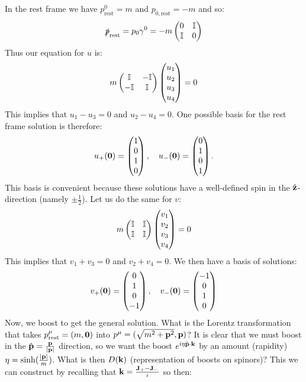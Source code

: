 In the rest frame we have $p^0_{\text{rest}} = m$ and $p_{0, \text{rest}} = -m$ and so:
\begin{equation}
    \slashed{p}_{\text{rest}} = p_0\gamma^0 = -m\begin{pmatrix}0 & \mathbb{I} \\ \mathbb{I} & 0\end{pmatrix}
\end{equation}
Thus our equation for $u$ is:
\begin{equation}
    m\begin{pmatrix}\mathbb{I} & -\mathbb{I} \\ -\mathbb{I} & \mathbb{I}\end{pmatrix}\begin{pmatrix}u_1 \\ u_2 \\ u_3 \\ u_4\end{pmatrix} = 0
\end{equation}
This implies that $u_1 -u_3 = 0$ and $u_2 -u_4 = 0$. One possible basis for the rest frame solution is therefore:
\begin{equation}
    u_+(\mathbf{0}) = \begin{pmatrix}1 \\ 0 \\ 1 \\ 0\end{pmatrix}, \quad u_-(\mathbf{0}) = \begin{pmatrix}0 \\ 1 \\ 0 \\ 1\end{pmatrix}.
\end{equation}
This basis is convenient because these solutions have a well-defined spin in the $\hat{\mathbf{z}}$-direction (namely $\pm \frac{1}{2}$). Let us do the same for $v$:
\begin{equation}
    m\begin{pmatrix}\mathbb{I} & \mathbb{I} \\ \mathbb{I} & \mathbb{I}\end{pmatrix}\begin{pmatrix}v_1 \\ v_2 \\ v_3 \\ v_4\end{pmatrix} = 0
\end{equation}
This implies that $v_1 + v_3 = 0$ and $v_2 + v_4 = 0$. We then have a basis of solutions:
\begin{equation}
    v_+(\mathbf{0}) = \begin{pmatrix}0 \\ 1 \\ 0 \\ -1\end{pmatrix}, \quad v_-(\mathbf{0}) = \begin{pmatrix}-1 \\ 0 \\ 1 \\ 0\end{pmatrix}
\end{equation}
Now, we boost to get the general solution. What is the Lorentz transformation that takes $p^\mu_{\text{rest}} = (m, \mathbf{0})$ into $p^\mu = (\sqrt{m^2 + \mathbf{p}^2}, \mathbf{p})$? It is clear that we must boost in the $\hat{\mathbf{p}} = \frac{\mathbf{p}}{\lvert \mathbf{p} \rvert}$ direction, so we want the boost $e^{i\eta \hat{\mathbf{p}} \cdot \mathbf{k}}$ by an amount (rapidity) $\eta = \sinh(\frac{\lvert \mathbf{p} \rvert}{m})$. What is then $D(\mathbf{k})$ (representation of boosts on spinors)? This we can construct by recalling that $\mathbf{k} = \frac{\mathbf{J}_+ - \mathbf{J}_-}{i}$ so then:
